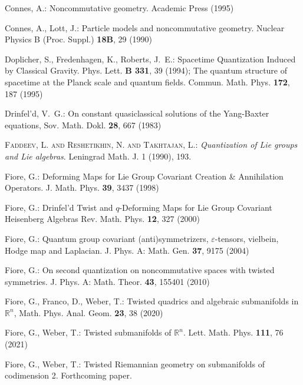 \documentclass[a4paper,11pt]{article}
\begin{document}
\begin{thebibliography}{99}
Connes, A.:
\newblock Noncommutative geometry.
\newblock Academic Press (1995)

Connes, A., Lott, J.:
\newblock Particle models and noncommutative geometry.
\newblock Nuclear Physics B (Proc. Suppl.)  {\bf 18B}, 29
(1990)

Doplicher, S., Fredenhagen, K., Roberts, J.~E.:
\newblock Spacetime Quantization Induced by Classical Gravity.
\newblock Phys. Lett. {\bf B 331}, 39
(1994); \newblock The quantum structure of spacetime at the Planck scale and quantum fields. \newblock Commun. Math. Phys. {\bf 172}, 187
(1995)

Drinfel'd, V.~G.:
\newblock On constant quasiclassical solutions of the Yang-Baxter equations,
\newblock  Sov. Math. Dokl. {\bf 28}, 667
(1983)

\textsc{{Faddeev}, L. and {Reshetikhin}, N. and {Takhtajan}, L.:}
{\it Quantization of Lie groups and Lie algebras}.
Leningrad Math. J. 1 (1990), 193.

Fiore, G.:
\newblock Deforming Maps for Lie Group Covariant Creation \& Annihilation Operators.
\newblock J. Math. Phys. {\bf 39}, 3437
(1998)

Fiore, G.:
\newblock Drinfel'd Twist and $q$-Deforming Maps for Lie Group
Covariant Heisenberg Algebras
\newblock Rev. Math. Phys. {\bf 12}, 327
(2000)

Fiore, G.:
\newblock Quantum group covariant (anti)symmetrizers,
$\varepsilon$-tensors, vielbein, Hodge map and Laplacian.
\newblock J. Phys. A: Math. Gen.  {\bf 37}, 9175
(2004)

Fiore, G.:
\newblock On second quantization on noncommutative spaces with twisted symmetries. \newblock J. Phys. A: Math. Theor. \textbf{43},
155401 (2010)

Fiore, G., Franco, D., Weber, T.:
\newblock Twisted quadrics and algebraic submanifolds in $\mathbb{R}^n$,
Math. Phys. Anal. Geom. \textbf{23}, 38 (2020)

Fiore, G., Weber, T.:
\newblock Twisted submanifolds of $\mathbb{R}^n$.
Lett. Math. Phys. \textbf{111}, 76 (2021)

Fiore, G., Weber, T.:
\newblock Twisted Riemannian geometry on submanifolds of codimension 2.
Forthcoming paper.


\end{thebibliography}
\end{document}
